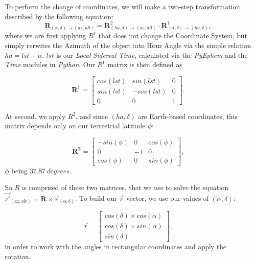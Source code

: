 \documentclass{article}
\begin{document}
To perform the change of coordinates, we will make a two-step transformation described by
the following equation:
\begin{equation}
\mathbf{R}_{(\alpha, \delta) \rightarrow (az, alt)}=\mathbf{R}^{2}_{(ha, \delta) \rightarrow
  (az, alt)} \cdot \mathbf{R}^{1}_{(\alpha, \delta)
  \rightarrow (ha, \delta)},
\label{eq:conv}
\end{equation}
where we are first applying $R^{1}$ that does not change the Coordinate
System, but simply rerwites the Azimuth of the object into Hour Angle
via the simple relation $ha = lst - \alpha$. $lst$ is our \emph{Local Sidereal
Time}, calculated via the \emph{PyEphem} and the \emph{Time} modules in
\emph{Python}. Our $R^{1}$ matrix is then defined as

\begin{equation}
\mathbf{R^{1}} =
 \begin{bmatrix}
  cos(lst) & sin(lst) & 0 \\
  sin(lst) & -cos(lst) & 0 \\  
  0 & 0 & 1
 \end{bmatrix}.
\end{equation}

At second, we apply $R^{2}$, and since $(ha, \delta)$ are Earth-based
coordinates, this matrix depends only on our terrestrial latitude
$\phi$: 

\begin{equation}
\mathbf{R^{2}} =
 \begin{bmatrix}
  -sin(\phi) & 0 & cos(\phi) \\
  0 & -1 & 0 \\  
  cos(\phi) & 0 & sin(\phi)
 \end{bmatrix},
\end{equation}
$\phi$ being $37.87 \ degrees$.

So $R$ is comprised of these two matrices, that we use to solve the
equation $\vec{r'}_{(az,alt)}=\textbf{R} \times
\vec{r}_{(\alpha,\delta)}$. To build our $\vec{r}$ vector, we use our
values of $(\alpha,\delta)$:

\begin{equation}
\vec{r} =
 \begin{bmatrix}
  cos(\delta) \times cos(\alpha) \\
  cos(\delta) \times sin(\alpha)  \\  
  sin(\delta) 
 \end{bmatrix},
\end{equation}
in order to work with the angles in rectangular coordinates and apply
the rotation.
\end{document}

